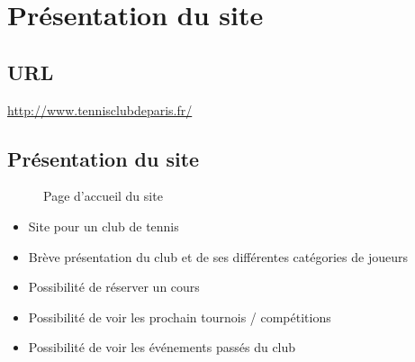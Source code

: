 \documentclass{article}[12pt]
\begin{document}


\tableofcontents%
\newpage


\section{Présentation du site}
\subsection{URL}
\url{http://www.tennisclubdeparis.fr/}
\subsection{Présentation du site}
\begin{figure}[H]
	\centering    {}
    \caption{Page d'accueil du site}
\end{figure}
\begin{itemize}
	\item Site pour un club de tennis
    \item Brève présentation du club et de ses différentes catégories de joueurs
    \item Possibilité de réserver un cours
    \item Possibilité de voir les prochain tournois / compétitions
    \item Possibilité de voir les événements passés du club
\end{itemize}
\end{document}
